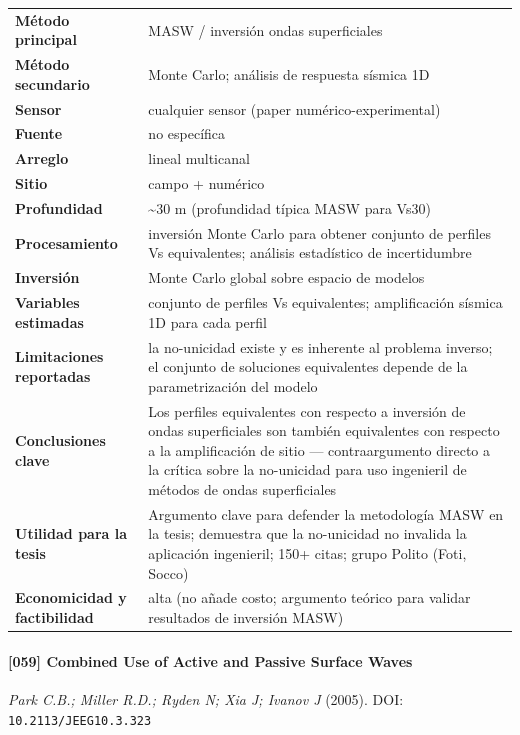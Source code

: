 \begin{center}\scriptsize
\begin{tabularx}{\textwidth}{@{}>{\bfseries}p{3.3cm} X@{}}
\toprule
M\'etodo principal & MASW / inversión ondas superficiales \\
M\'etodo secundario & Monte Carlo; análisis de respuesta sísmica 1D \\
Sensor & cualquier sensor (paper numérico-experimental) \\
Fuente & no específica \\
Arreglo & lineal multicanal \\
Sitio & campo + numérico \\
Profundidad & \textasciitilde{}30 m (profundidad típica MASW para Vs30) \\
Procesamiento & inversión Monte Carlo para obtener conjunto de perfiles Vs equivalentes; análisis estadístico de incertidumbre \\
Inversi\'on & Monte Carlo global sobre espacio de modelos \\
Variables estimadas & conjunto de perfiles Vs equivalentes; amplificación sísmica 1D para cada perfil \\
Limitaciones reportadas & la no-unicidad existe y es inherente al problema inverso; el conjunto de soluciones equivalentes depende de la parametrización del modelo \\
Conclusiones clave & Los perfiles equivalentes con respecto a inversión de ondas superficiales son también equivalentes con respecto a la amplificación de sitio --- contraargumento directo a la crítica sobre la no-unicidad para uso ingenieril de métodos de ondas superficiales \\
Utilidad para la tesis & Argumento clave para defender la metodología MASW en la tesis; demuestra que la no-unicidad no invalida la aplicación ingenieril; 150+ citas; grupo Polito (Foti, Socco) \\
Economicidad y factibilidad & alta (no añade costo; argumento teórico para validar resultados de inversión MASW) \\
\bottomrule
\end{tabularx}
\end{center}

\paragraph{[059] Combined Use of Active and Passive Surface Waves} \emph{Park C.B.; Miller R.D.; Ryden N; Xia J; Ivanov J} (2005).
{\scriptsize DOI: \texttt{10.2113/JEEG10.3.323}}

